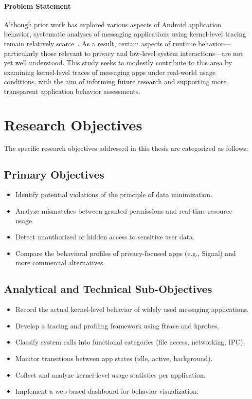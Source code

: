 \documentclass[a4paper,12pt]{report}
\begin{document}
\paragraph{Problem Statement}

Although prior work has explored various aspects of Android application behavior,
systematic analyses of messaging applications using kernel-level tracing remain
relatively scarce~\cite{DynamicSecurityAnalysis2023}. As a result, certain aspects
of runtime behavior—particularly those relevant to privacy and low-level system
interactions—are not yet well understood. This study seeks to modestly contribute
to this area by examining kernel-level traces of messaging apps under real-world
usage conditions, with the aim of informing future research and supporting more
transparent application behavior assessments.

\section{Research Objectives}

The specific research objectives addressed in this thesis are categorized as follows:

\subsection*{Primary Objectives}
\begin{itemize}
\item Identify potential violations of the principle of data minimization.
\item Analyze mismatches between granted permissions and real-time resource usage.
\item Detect unauthorized or hidden access to sensitive user data.
\item Compare the behavioral profiles of privacy-focused apps (e.g., Signal)
and more commercial alternatives.
\end{itemize}

\subsection*{Analytical and Technical Sub-Objectives}
\begin{itemize}
\item Record the actual kernel-level behavior of widely used messaging applications.
\item Develop a tracing and profiling framework using ftrace and kprobes.
\item Classify system calls into functional categories (file access, networking, IPC).
\item Monitor transitions between app states (idle, active, background).
\item Collect and analyze kernel-level usage statistics per application.
\item Implement a web-based dashboard for behavior visualization.
\end{itemize}
\end{document}
